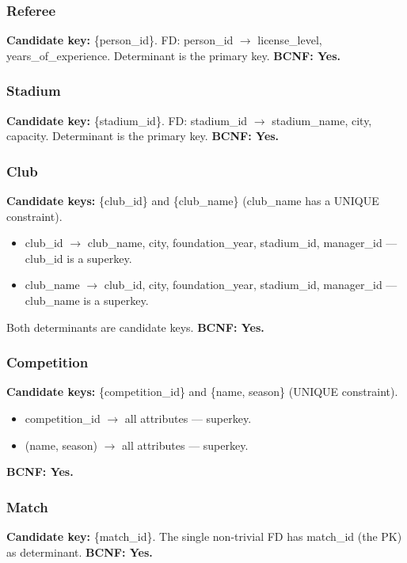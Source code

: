 \documentclass[12pt]{article}
\begin{document}
\subsubsection{Referee}
\textbf{Candidate key:} \{person\_id\}. FD: person\_id $\rightarrow$ license\_level, years\_of\_experience. Determinant is the primary key. \textbf{BCNF: Yes.}

\subsubsection{Stadium}
\textbf{Candidate key:} \{stadium\_id\}. FD: stadium\_id $\rightarrow$ stadium\_name, city, capacity. Determinant is the primary key. \textbf{BCNF: Yes.}

\subsubsection{Club}
\textbf{Candidate keys:} \{club\_id\} and \{club\_name\} (club\_name has a UNIQUE constraint).
\begin{itemize}
    \item club\_id $\rightarrow$ club\_name, city, foundation\_year, stadium\_id, manager\_id --- club\_id is a superkey. \checkmark
    \item club\_name $\rightarrow$ club\_id, city, foundation\_year, stadium\_id, manager\_id --- club\_name is a superkey. \checkmark
\end{itemize}
Both determinants are candidate keys. \textbf{BCNF: Yes.}

\subsubsection{Competition}
\textbf{Candidate keys:} \{competition\_id\} and \{name, season\} (UNIQUE constraint).
\begin{itemize}
    \item competition\_id $\rightarrow$ all attributes --- superkey. \checkmark
    \item (name, season) $\rightarrow$ all attributes --- superkey. \checkmark
\end{itemize}
\textbf{BCNF: Yes.}

\subsubsection{Match}
\textbf{Candidate key:} \{match\_id\}. The single non-trivial FD has match\_id (the PK) as determinant. \textbf{BCNF: Yes.}
\end{document}
